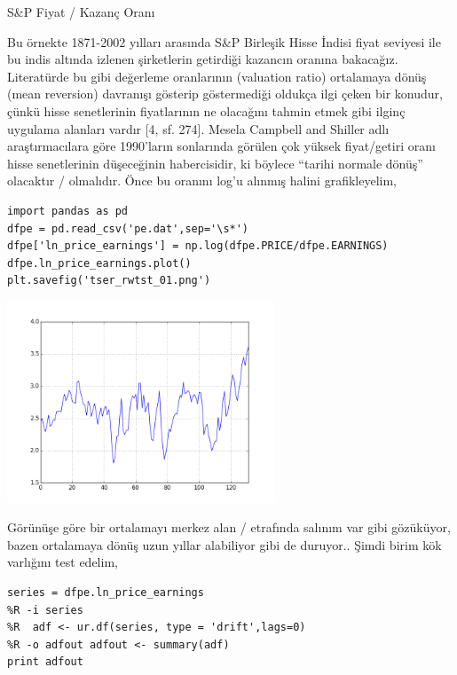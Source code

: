 \documentclass[12pt,fleqn]{article}\usepackage{../../common}
\begin{document}
S\&P Fiyat / Kazanç Oranı

Bu örnekte 1871-2002 yılları arasında S\&P Birleşik Hisse İndisi fiyat seviyesi
ile bu indis altında izlenen şirketlerin getirdiği kazancın oranına
bakacağız. Literatürde bu gibi değerleme oranlarının (valuation ratio)
ortalamaya dönüş (mean reversion) davranışı gösterip göstermediği oldukça ilgi
çeken bir konudur, çünkü hisse senetlerinin fiyatlarının ne olacağını tahmin
etmek gibi ilginç uygulama alanları vardır [4, sf. 274]. Mesela Campbell and
Shiller adlı araştırmacılara göre 1990'ların sonlarında görülen çok yüksek
fiyat/getiri oranı hisse senetlerinin düşeceğinin habercisidir, ki böylece
``tarihi normale dönüş'' olacaktır / olmalıdır. Önce bu oranını log'u alınmış
halini grafikleyelim,

\begin{verbatim}
import pandas as pd
dfpe = pd.read_csv('pe.dat',sep='\s*')
dfpe['ln_price_earnings'] = np.log(dfpe.PRICE/dfpe.EARNINGS)
dfpe.ln_price_earnings.plot()
plt.savefig('tser_rwtst_01.png')
\end{verbatim}

\includegraphics[height=6cm]{tser_rwtst_01.png}

Görünüşe göre bir ortalamayı merkez alan / etrafında salınım var gibi
gözüküyor, bazen ortalamaya dönüş uzun yıllar alabiliyor gibi de
duruyor.. Şimdi birim kök varlığını test edelim,

\begin{verbatim}
series = dfpe.ln_price_earnings
%R -i series
%R  adf <- ur.df(series, type = 'drift',lags=0)
%R -o adfout adfout <- summary(adf)
print adfout
\end{verbatim}
\end{document}
